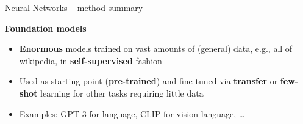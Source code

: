\documentclass[11pt,compress,t,notes=noshow, xcolor=table]{beamer}
\newcommand{\highlight}[1]{\textcolor{hlcol}{\textbf{#1}}}
\begin{document}
\begin{frame2}{Neural Networks -- method summary}

\highlight{Foundation models}

\begin{itemize}
    \item \textbf{Enormous} models trained on vast amounts of (general) data, e.g., all of wikipedia, in \textbf{self-supervised} fashion
    \item Used as starting point (\textbf{pre-trained}) and fine-tuned via \textbf{transfer} or \textbf{few-shot} learning for other tasks requiring little data
    \item Examples: GPT-3 for language, CLIP for vision-language, \dots
\end{itemize}


  
\end{frame2}
\end{document}
